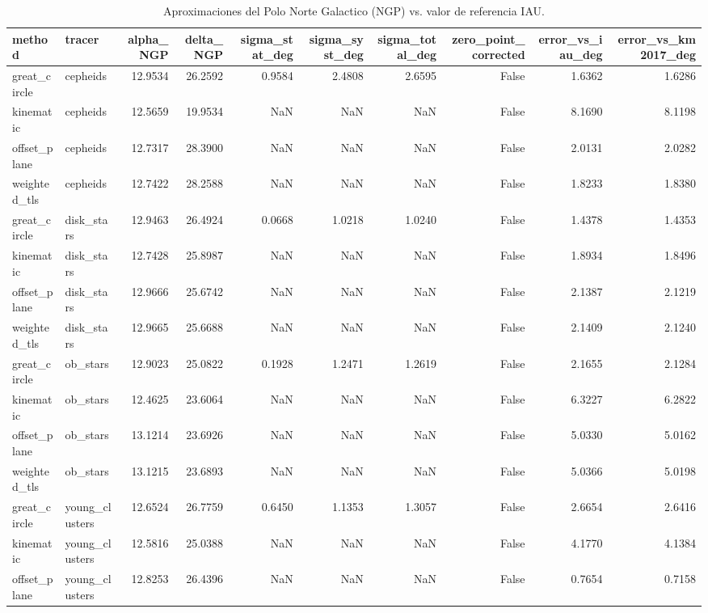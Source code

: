 \begin{table}[htbp]
\centering
\caption{Aproximaciones del Polo Norte Galactico (NGP) vs. valor de referencia IAU.}
\label{tab:ngp_comparison}
\begin{tabular}{llrrrrrrrr}
\toprule
method & tracer & alpha_NGP & delta_NGP & sigma_stat_deg & sigma_syst_deg & sigma_total_deg & zero_point_corrected & error_vs_iau_deg & error_vs_km2017_deg \\
\midrule
great_circle & cepheids & 12.9534 & 26.2592 & 0.9584 & 2.4808 & 2.6595 & False & 1.6362 & 1.6286 \\
kinematic & cepheids & 12.5659 & 19.9534 & NaN & NaN & NaN & False & 8.1690 & 8.1198 \\
offset_plane & cepheids & 12.7317 & 28.3900 & NaN & NaN & NaN & False & 2.0131 & 2.0282 \\
weighted_tls & cepheids & 12.7422 & 28.2588 & NaN & NaN & NaN & False & 1.8233 & 1.8380 \\
great_circle & disk_stars & 12.9463 & 26.4924 & 0.0668 & 1.0218 & 1.0240 & False & 1.4378 & 1.4353 \\
kinematic & disk_stars & 12.7428 & 25.8987 & NaN & NaN & NaN & False & 1.8934 & 1.8496 \\
offset_plane & disk_stars & 12.9666 & 25.6742 & NaN & NaN & NaN & False & 2.1387 & 2.1219 \\
weighted_tls & disk_stars & 12.9665 & 25.6688 & NaN & NaN & NaN & False & 2.1409 & 2.1240 \\
great_circle & ob_stars & 12.9023 & 25.0822 & 0.1928 & 1.2471 & 1.2619 & False & 2.1655 & 2.1284 \\
kinematic & ob_stars & 12.4625 & 23.6064 & NaN & NaN & NaN & False & 6.3227 & 6.2822 \\
offset_plane & ob_stars & 13.1214 & 23.6926 & NaN & NaN & NaN & False & 5.0330 & 5.0162 \\
weighted_tls & ob_stars & 13.1215 & 23.6893 & NaN & NaN & NaN & False & 5.0366 & 5.0198 \\
great_circle & young_clusters & 12.6524 & 26.7759 & 0.6450 & 1.1353 & 1.3057 & False & 2.6654 & 2.6416 \\
kinematic & young_clusters & 12.5816 & 25.0388 & NaN & NaN & NaN & False & 4.1770 & 4.1384 \\
offset_plane & young_clusters & 12.8253 & 26.4396 & NaN & NaN & NaN & False & 0.7654 & 0.7158 \\
\bottomrule
\end{tabular}
\end{table}

